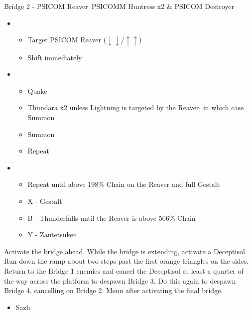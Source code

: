 \begin{multicols}{2}
  \begin{battle}[0:43]{Bridge 2 - PSICOM Reaver\, PSICOMM Huntress x2 \& PSICOM Destroyer}%
    \begin{itemize}
      \item \first
            \begin{itemize}
              \item Target PSICOM Reaver ($\downarrow\downarrow/\uparrow\uparrow$)
              \item Shift immediately
            \end{itemize}
      \item \second
            \begin{itemize}
              \item Quake
              \item Thundara x2 unless Lightning is targeted by the Reaver, in which case Summon
              \item Summon
              \item Repeat
            \end{itemize}
      \item \third
            \begin{itemize}
              \item Repeat until above 198\% Chain on the Reaver and full Gestalt
              \item X - Gestalt
              \item B - Thunderfalls until the Reaver is above 506\% Chain
              \item Y - Zantetsuken
            \end{itemize}
    \end{itemize}
       
  \end{battle}
  Activate the bridge ahead. While the bridge is extending, activate a Deceptisol.  Run down the ramp about two steps past the first orange triangles on the sides. Return to the Bridge 1 enemies and cancel the Deceptisol at least a quarter of the way across the platform to despawn Bridge 3. Do this again to despawn Bridge 4, cancelling on Bridge 2. Menu after activating the final bridge.
  \begin{menu}
    \begin{itemize}
      \crystarium
      \begin{itemize}
        \item Sazh
              \begin{itemize}

\end{itemize}
\end{itemize}
\end{itemize}
\end{menu}
\end{multicols}
